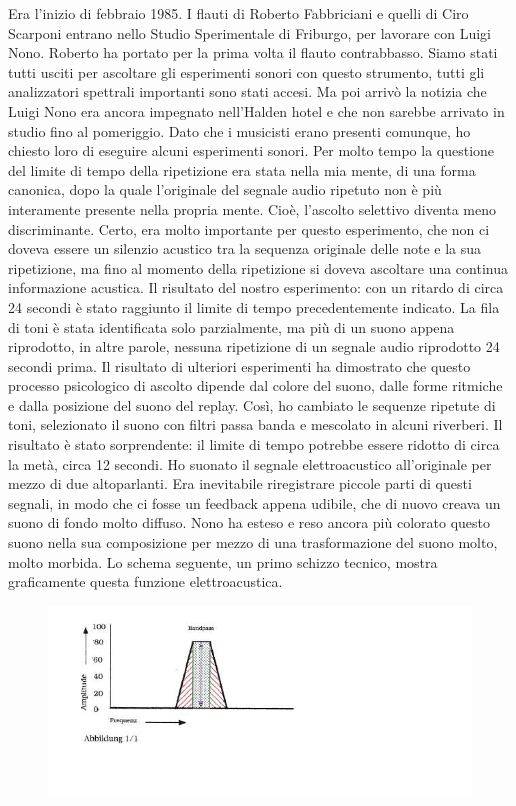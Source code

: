 Era l'inizio di febbraio 1985. I flauti di Roberto Fabbriciani e quelli di Ciro Scarponi entrano nello Studio Sperimentale di Friburgo, per lavorare con Luigi Nono. Roberto ha portato per la prima volta il flauto contrabbasso. Siamo stati tutti usciti per ascoltare gli esperimenti sonori con questo strumento, tutti gli analizzatori spettrali importanti sono stati accesi. Ma poi arrivò la notizia che Luigi Nono era ancora impegnato nell'Halden hotel e che non sarebbe arrivato in studio fino al pomeriggio. Dato che i musicisti erano presenti comunque, ho chiesto loro di eseguire alcuni esperimenti sonori. Per molto tempo la questione del limite di tempo della ripetizione era stata nella mia mente, di una forma canonica, dopo la quale l'originale del segnale audio ripetuto non è più interamente presente nella propria mente. Cioè, l'ascolto selettivo diventa meno discriminante. Certo, era molto importante per questo esperimento, che non ci doveva essere un silenzio acustico tra la sequenza originale delle note e la sua ripetizione, ma fino al momento della ripetizione si doveva ascoltare una continua informazione acustica. Il risultato del nostro esperimento: con un ritardo di circa 24 secondi è stato raggiunto il limite di tempo precedentemente indicato. La fila di toni è stata identificata solo parzialmente, ma più di un suono appena riprodotto, in altre parole, nessuna ripetizione di un segnale audio riprodotto 24 secondi prima.
Il risultato di ulteriori esperimenti ha dimostrato che questo processo psicologico di ascolto dipende dal colore del suono, dalle forme ritmiche e dalla posizione del suono del replay. Così, ho cambiato le sequenze ripetute di toni, selezionato il suono con filtri passa banda e mescolato in alcuni riverberi. Il risultato è stato sorprendente: il limite di tempo potrebbe essere ridotto di circa la metà, circa 12 secondi. Ho suonato il segnale elettroacustico all'originale per mezzo di due altoparlanti. Era inevitabile riregistrare piccole parti di questi segnali, in modo che ci fosse un feedback appena udibile, che di nuovo creava un suono di fondo molto diffuso. Nono ha esteso e reso ancora più colorato questo suono nella sua composizione per mezzo di una trasformazione del suono molto, molto morbida. Lo schema seguente, un primo schizzo tecnico, mostra graficamente questa funzione elettroacustica.

\begin{figure}[htbp]
\begin{center}
\includegraphics[width=1\textwidth]{images/nono/hph/ab_v_01.jpg}
\caption{}
\label{hph-img1}
\end{center}
\end{figure}

